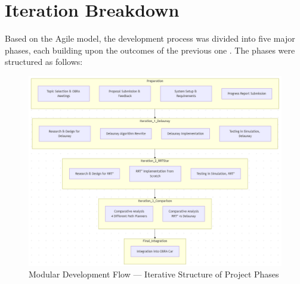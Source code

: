 \documentclass[a4paper,11pt]{report}
\begin{document}
\section{Iteration Breakdown}

Based on the Agile model, the development process was divided into five major phases, each building upon the outcomes of the previous one \cite{reference21, reference22}. 
The phases were structured as follows:

\begin{figure}[H]
    \centering
    \includegraphics[width=1\textwidth]{Images/methodology.png}
    \caption{Modular Development Flow — Iterative Structure of Project Phases}
    \label{fig:methodology_diagram}
\end{figure}
\end{document}
